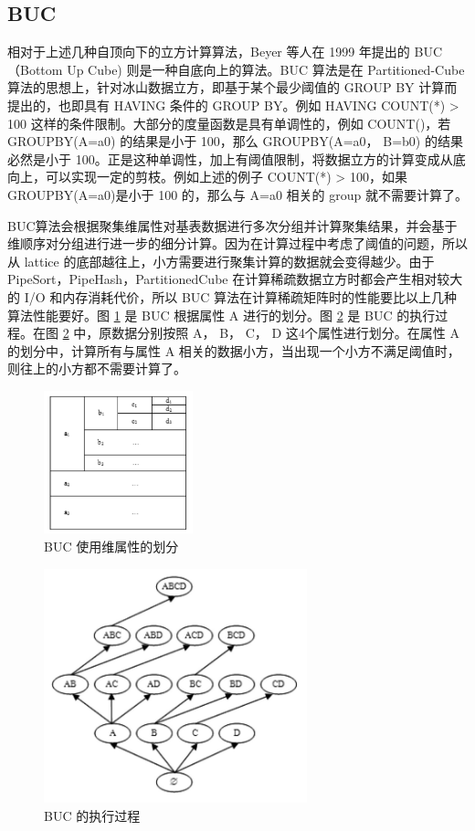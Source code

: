 \subsection{BUC}

相对于上述几种自顶向下的立方计算算法，Beyer 等人在 1999 年提出的 BUC （Bottom Up Cube) 则是一种自底向上的算法。BUC 算法是在 Partitioned-Cube 算法的思想上，针对冰山数据立方，即基于某个最少阈值的 GROUP BY 计算而提出的，也即具有 HAVING 条件的 GROUP BY。例如 HAVING COUNT(*) > 100 这样的条件限制。大部分的度量函数是具有单调性的，例如 COUNT()，若 GROUPBY(A=a0) 的结果是小于 100，那么 GROUPBY(A=a0， B=b0) 的结果必然是小于 100。正是这种单调性，加上有阈值限制，将数据立方的计算变成从底向上，可以实现一定的剪枝。例如上述的例子 COUNT(*) > 100，如果 GROUPBY(A=a0)是小于 100 的，那么与 A=a0 相关的 group 就不需要计算了。

BUC算法会根据聚集维属性对基表数据进行多次分组并计算聚集结果，并会基于维顺序对分组进行进一步的细分计算。因为在计算过程中考虑了阈值的问题，所以从 lattice 的底部越往上，小方需要进行聚集计算的数据就会变得越少。由于 PipeSort，PipeHash，PartitionedCube 在计算稀疏数据立方时都会产生相对较大的 I/O 和内存消耗代价，所以 BUC 算法在计算稀疏矩阵时的性能要比以上几种算法性能要好。图 \ref{BUC_partition} 是 BUC 根据属性 A 进行的划分。图 \ref{BUC_execution} 是 BUC 的执行过程。在图 \ref{BUC_execution} 中，原数据分别按照 A， B， C， D 这4个属性进行划分。在属性 A 的划分中，计算所有与属性 A 相关的数据小方，当出现一个小方不满足阈值时，则往上的小方都不需要计算了。

\begin{figure}[!htb]
\centering\includegraphics[width=1.7in]{picture/ch_current_research/BUC_partition} 
\caption{BUC 使用维属性的划分}\label{BUC_partition} 
\end{figure} 


\begin{figure}[!htb]
\centering\includegraphics[width=3in]{picture/ch_current_research/BUC_execution} 
\caption{BUC 的执行过程}\label{BUC_execution} 
\end{figure} 



